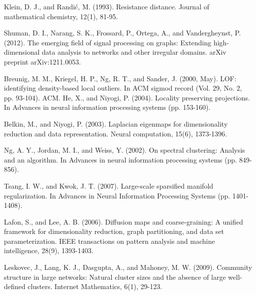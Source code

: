 \documentclass[preprint, review, 12pt]{article}
\theoremstyle{definition}
\theoremstyle{remark}
\begin{document}
\newpage
\begin{thebibliography}{}



Klein, D. J., and Randić, M. (1993). Resistance distance. Journal of mathematical chemistry, 12(1), 81-95.

 Shuman, D. I., Narang, S. K., Frossard, P., Ortega, A., and Vandergheynst, P. (2012). The emerging field of signal processing on graphs: Extending high-dimensional data analysis to networks and other irregular domains. arXiv preprint arXiv:1211.0053.

 Breunig, M. M., Kriegel, H. P., Ng, R. T., and Sander, J. (2000, May). LOF: identifying density-based local outliers. In ACM sigmod record (Vol. 29, No. 2, pp. 93-104). ACM.
 He, X., and Niyogi, P. (2004). Locality preserving projections. In Advances in neural information processing systems (pp. 153-160).

 Belkin, M., and Niyogi, P. (2003). Laplacian eigenmaps for dimensionality reduction and data representation. Neural computation, 15(6), 1373-1396.

 Ng, A. Y., Jordan, M. I., and Weiss, Y. (2002). On spectral clustering: Analysis and an algorithm. In Advances in neural information processing systems (pp. 849-856).

 Tsang, I. W., and Kwok, J. T. (2007). Large-scale sparsified manifold regularization. In Advances in Neural Information Processing Systems (pp. 1401-1408).


 Lafon, S., and Lee, A. B. (2006). Diffusion maps and coarse-graining: A unified framework for dimensionality reduction, graph partitioning, and data set parameterization. IEEE transactions on pattern analysis and machine intelligence, 28(9), 1393-1403.

 Leskovec, J., Lang, K. J., Dasgupta, A., and Mahoney, M. W. (2009). Community structure in large networks: Natural cluster sizes and the absence of large well-defined clusters. Internet Mathematics, 6(1), 29-123.

\end{thebibliography}
\end{document}
